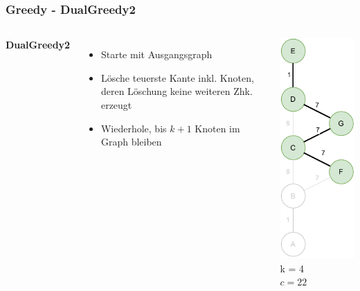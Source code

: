 \documentclass[aspectratio=169]{beamer}
\begin{document}
\begin{frame}
	\frametitle{Greedy - DualGreedy2}
	\begin{columns}[c] %
		
		\textbf{DualGreedy2}
		\begin{itemize}
			\item Starte mit Ausgangsgraph
			\item Lösche teuerste Kante inkl. Knoten, deren Löschung keine weiteren Zhk. erzeugt
			\item Wiederhole, bis $k+1$ Knoten im Graph bleiben 
		\end{itemize}
		\includegraphics[scale=.6]{greedy_greedy2.pdf}
		k = 4\\
		$c = 22$
		
		
	\end{columns}
	\end{frame}
	
\end{document}
